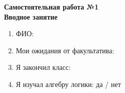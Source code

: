 



    \begin{center}
        \textbf{
            Самостоятельная работа №1\\
            Вводное занятие}
    \end{center}

    \begin{enumerate}
        \item ФИО:
        \item Мои ожидания от факультатива:\\
        \item Я закончил класс:
        \item Я изучал алгебру логики: да / нет

    \end{enumerate}

